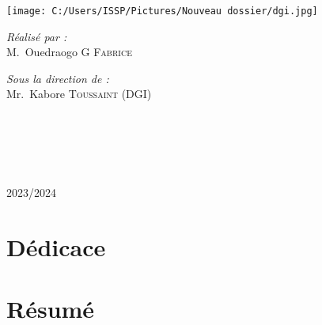 \documentclass[a4paper,12pt]{report}
\begin{document}
\begin{titlepage}
\begin{center}
\begin{minipage}{2.5cm}
	\begin{center}
		\texttt{[image: C:/Users/ISSP/Pictures/Nouveau dossier/dgi.jpg]}
	\end{center}

\end{minipage}

\noindent
\begin{minipage}{0.4\textwidth}
  \begin{flushleft} \large
    \emph{\color{orange!80!black}Réalisé par :}\\
    M.~Ouedraogo \textsc{G Fabrice}\\
  \end{flushleft}
\end{minipage}%
\begin{minipage}{0.5\textwidth}
  \begin{flushright} \large
    \emph{\color{orange!80!black}Sous la direction de :} \\
    Mr.~Kabore \textsc{Toussaint} (DGI)
  \end{flushright}
\end{minipage}\\[1cm]

\\[0.5cm]

\color{black}
\centering
\begin{tabular}{lll}

\end{tabular}

\vfill

{\large \color{orange!80!black}{Année universitaire}\\ \color{blue!80!black}2023/2024}
\end{center}
\end{titlepage}
\newpage
\tableofcontents
\listoffigures
\listoftables
\newpage


\chapter*{Dédicace}

\chapter*{Résumé}
\end{document}
